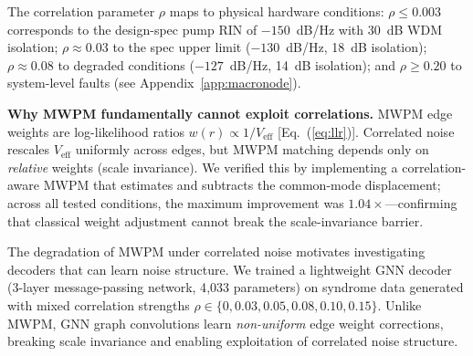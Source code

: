 \documentclass[twocolumn,showpacs,preprintnumbers,amsmath,amssymb,superscriptaddress]{revtex4-2}
\begin{document}
The correlation parameter $\rho$ maps to physical hardware conditions: $\rho \leq 0.003$ corresponds to the design-spec pump RIN of $-150$~dB/Hz with 30~dB WDM isolation; $\rho \approx 0.03$ to the spec upper limit ($-130$~dB/Hz, 18~dB isolation); $\rho \approx 0.08$ to degraded conditions ($-127$~dB/Hz, 14~dB isolation); and $\rho \geq 0.20$ to system-level faults (see Appendix~\ref{app:macronode}).

\textbf{Why MWPM fundamentally cannot exploit correlations.} MWPM edge weights are log-likelihood ratios $w(r) \propto 1/V_{\mathrm{eff}}$ [Eq.~(\ref{eq:llr})]. Correlated noise rescales $V_{\mathrm{eff}}$ uniformly across edges, but MWPM matching depends only on \emph{relative} weights (scale invariance). We verified this by implementing a correlation-aware MWPM that estimates and subtracts the common-mode displacement; across all tested conditions, the maximum improvement was $1.04\times$---confirming that classical weight adjustment cannot break the scale-invariance barrier.

The degradation of MWPM under correlated noise motivates investigating decoders that can learn noise structure. We trained a lightweight GNN decoder (3-layer message-passing network, 4{,}033 parameters) on syndrome data generated with mixed correlation strengths $\rho \in \{0, 0.03, 0.05, 0.08, 0.10, 0.15\}$. Unlike MWPM, GNN graph convolutions learn \emph{non-uniform} edge weight corrections, breaking scale invariance and enabling exploitation of correlated noise structure.
\end{document}
